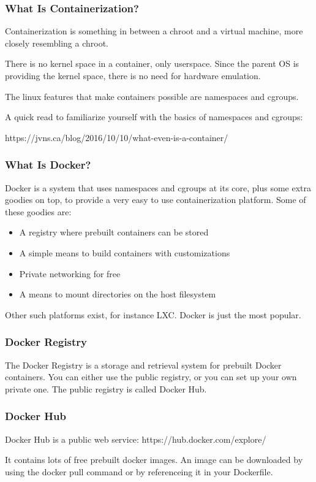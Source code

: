 \documentclass[helvetica,english,utf8,notitle,nologo]{beamer}
\begin{document}
\begin{frame}
  \frametitle{What Is Containerization?}

  Containerization is something in between a chroot and a virtual
  machine, more closely resembling a chroot.

  There is no kernel space in a container, only userspace. Since the
  parent OS is providing the kernel space, there is no need for
  hardware emulation.

  The linux features that make containers possible are namespaces and
  cgroups.

  A quick read to familiarize yourself with the basics of namespaces
  and cgroups:

  https://jvns.ca/blog/2016/10/10/what-even-is-a-container/
\end{frame}

\begin{frame}
  \frametitle{What Is Docker?}

  Docker is a system that uses namespaces and cgroups at its core,
  plus some extra goodies on top, to provide a very easy to use
  containerization platform. Some of these goodies are:

  \begin{itemize}
  \item A registry where prebuilt containers can be stored
  \item A simple means to build containers with customizations
  \item Private networking for free
  \item A means to mount directories on the host filesystem
  \end{itemize}

  Other such platforms exist, for instance LXC. Docker is just the
  most popular.
\end{frame}

\begin{frame}
  \frametitle{Docker Registry}

  The Docker Registry is a storage and retrieval system for prebuilt
  Docker containers. You can either use the public registry, or you
  can set up your own private one. The public registry is called
  Docker Hub.
\end{frame}

\begin{frame}
  \frametitle{Docker Hub}

  Docker Hub is a public web service: https://hub.docker.com/explore/

  It contains lots of free prebuilt docker images. An image can be
  downloaded by using the docker pull command or by referenceing it in
  your Dockerfile.
\end{frame}
\end{document}

